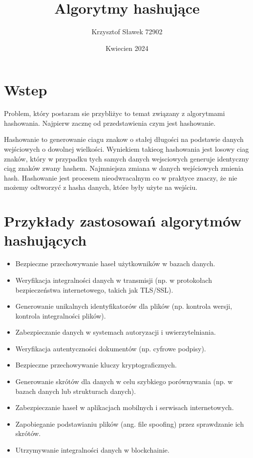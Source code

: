 \documentclass{article}
\title{Algorytmy hashujące}
\author{Krzysztof Sławek 72902}
\date{Kwiecien 2024}
\begin{document}
\maketitle

\section{Wstep}

Problem, który postaram sie przybliżyc to temat związany z algorytmami hashowania.
Najpierw zacznę od przedstawienia czym jest hashowanie.

Hashowanie to generowanie ciagu znakow o stałej długości na podstawie danych wejściowych o dowolnej wielkości. Wyniekiem takieog hashowania jest losowy ciag znaków, który w przypadku tych samych danych wejsciowych generuje identyczny ciąg znaków zwany hashem. Najmniejsza zmiana w danych wejściowych zmienia hash. 
Hashowanie jest procesem nieodwracalnym co w praktyce znaczy, że nie możemy odtworzyć z hasha danych, które były użyte na wejściu.

\section{Przykłady zastosowań algorytmów hashujących}

\begin{itemize}
    \item Bezpieczne przechowywanie haseł użytkowników w bazach danych.
    \item Weryfikacja integralności danych w transmisji 
    (np. w protokołach bezpieczeństwa internetowego, takich jak TLS/SSL).
    \item Generowanie unikalnych identyfikatorów dla plików (np. kontrola wersji, kontrola integralności plików).
    \item Zabezpieczanie danych w systemach autoryzacji i uwierzytelniania.
    \item Weryfikacja autentyczności dokumentów (np. cyfrowe podpisy).
    \item Bezpieczne przechowywanie kluczy kryptograficznych.
    \item Generowanie skrótów dla danych w celu szybkiego porównywania (np. w bazach danych lub strukturach danych).
    \item Zabezpieczanie haseł w aplikacjach mobilnych i serwisach internetowych.
    \item Zapobieganie podstawianiu plików (ang. file spoofing) przez sprawdzanie ich skrótów.
    \item Utrzymywanie integralności danych w blockchainie.
\end{itemize}
\end{document}
